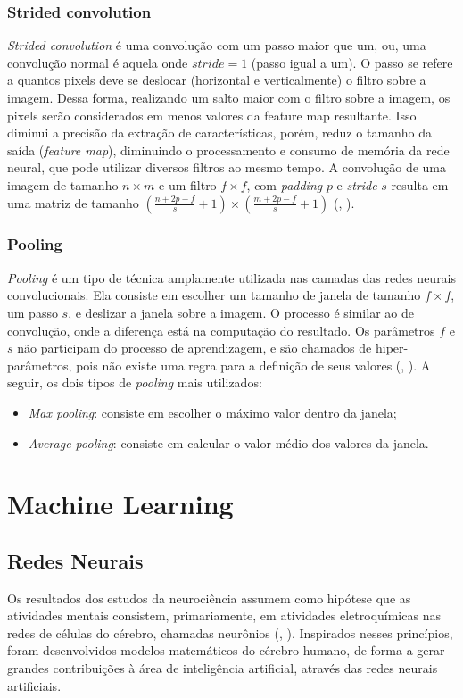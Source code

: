 \documentclass[]{politex}
\begin{document}
\subsubsection{Strided convolution}
\textit{Strided convolution} é uma convolução com um passo maior que um, ou, uma convolução normal é aquela onde \(stride=1\) (passo igual a um). O passo se refere a quantos pixels deve se deslocar (horizontal e verticalmente) o filtro sobre a imagem. Dessa forma, realizando um salto maior com o filtro sobre a imagem, os pixels serão considerados em menos valores da feature map resultante. Isso diminui a precisão da extração de características, porém, reduz o tamanho da saída (\textit{feature map}), diminuindo o processamento e consumo de memória da rede neural, que pode utilizar diversos filtros ao mesmo tempo. A convolução de uma imagem de tamanho \(n \times m\) e um filtro \(f \times f\), com \textit{padding} \(p\) e \textit{stride} \(s\) resulta em uma matriz de tamanho \((\frac{n+2p-f}{s}+1) \times (\frac{m+2p-f}{s}+1)\) (, \citeyear{cnncourse}).

\subsubsection{Pooling}
\textit{Pooling} é um tipo de técnica amplamente utilizada nas camadas das redes neurais convolucionais. Ela consiste em escolher um tamanho de janela de tamanho \(f \times f\), um passo \(s\), e deslizar a janela sobre a imagem. O processo é similar ao de convolução, onde a diferença está na computação do resultado. Os parâmetros \(f\) e \(s\) não participam do processo de aprendizagem, e são chamados de hiper-parâmetros, pois não existe uma regra para a definição de seus valores (, \citeyear{cnncourse}). A seguir, os dois tipos de \textit{pooling} mais utilizados:
\begin{itemize}
\item \textit{Max pooling}: consiste em escolher o máximo valor dentro da janela;
\item \textit{Average pooling}: consiste em calcular o valor médio dos valores da janela.
\end{itemize}

\section{Machine Learning}
\subsection{Redes Neurais}
Os resultados dos estudos da neurociência assumem como hipótese que as atividades mentais consistem, primariamente, em atividades eletroquímicas nas redes de células do cérebro, chamadas neurônios (, \citeyear{Russell}). Inspirados nesses princípios, foram desenvolvidos modelos matemáticos do cérebro humano, de forma a gerar grandes contribuições à área de inteligência artificial, através das redes neurais artificiais.
\end{document}
